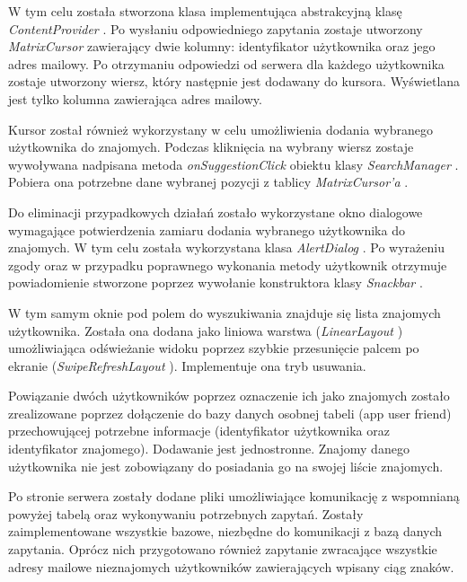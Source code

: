 \par W tym celu została stworzona klasa implementująca abstrakcyjną klasę \textit{ContentProvider} \cite{ContentProvider}. Po wysłaniu odpowiedniego zapytania zostaje utworzony \textit{MatrixCursor} \cite{MatrixCursor} zawierający dwie kolumny: identyfikator użytkownika oraz jego adres mailowy. Po otrzymaniu odpowiedzi od serwera dla każdego użytkownika zostaje utworzony wiersz, który następnie jest dodawany do kursora. Wyświetlana jest tylko kolumna zawierająca adres mailowy.

\par Kursor został również wykorzystany w celu umożliwienia dodania wybranego użytkownika do znajomych. Podczas kliknięcia na wybrany wiersz zostaje wywoływana nadpisana metoda \textit{onSuggestionClick} obiektu klasy \textit{SearchManager} \cite{SearchManager}. Pobiera ona potrzebne dane wybranej pozycji z tablicy \textit{MatrixCursor’a} \cite{MatrixCursor}.

\par Do eliminacji przypadkowych działań zostało wykorzystane okno dialogowe wymagające potwierdzenia  zamiaru dodania wybranego użytkownika do znajomych. W tym celu została wykorzystana klasa \textit{AlertDialog} \cite{AlertDialog}. Po wyrażeniu zgody  oraz w przypadku poprawnego wykonania metody użytkownik otrzymuje powiadomienie stworzone poprzez wywołanie konstruktora klasy \textit{Snackbar} \cite{Snackbar}.

\par W tym samym oknie pod polem do wyszukiwania znajduje się lista znajomych użytkownika. Została ona dodana jako liniowa warstwa (\textit{LinearLayout} \cite{LinearLayout}) umożliwiająca odświeżanie widoku poprzez szybkie przesunięcie palcem po ekranie (\textit{SwipeRefreshLayout} \cite{SwipeRefreshLayout}). Implementuje ona tryb usuwania.

\par Powiązanie dwóch użytkowników poprzez oznaczenie ich jako znajomych zostało zrealizowane poprzez dołączenie do bazy danych osobnej tabeli (app user friend)  przechowującej potrzebne informacje (identyfikator użytkownika oraz identyfikator znajomego). Dodawanie jest jednostronne. Znajomy danego użytkownika nie jest zobowiązany do posiadania go na swojej liście znajomych.

\par Po stronie serwera zostały dodane pliki umożliwiające komunikację z wspomnianą powyżej tabelą oraz wykonywaniu potrzebnych zapytań. Zostały zaimplementowane wszystkie bazowe, niezbędne do komunikacji z bazą danych zapytania. Oprócz nich przygotowano również zapytanie zwracające wszystkie adresy mailowe nieznajomych użytkowników zawierających wpisany ciąg znaków.

